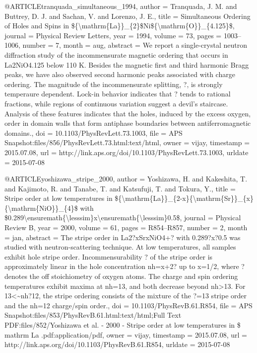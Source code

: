 @ARTICLE{tranquada_simultaneous_1994,
  author = {Tranquada, J. M. and Buttrey, D. J. and Sachan, V. and Lorenzo, J.
	E.},
  title = {Simultaneous {Ordering} of {Holes} and {Spins} in \$\{{\textbackslash}mathrm\{{La}\}\}\_\{2\}\${Ni}\$\{{\textbackslash}mathrm\{{O}\}\}\_\{4.125\}\$},
  journal = {Physical Review Letters},
  year = {1994},
  volume = {73},
  pages = {1003--1006},
  number = {7},
  month = aug,
  abstract = {We report a single-crystal neutron diffraction study of the incommensurate
	magnetic ordering that occurs in La2NiO4.125 below 110 K. Besides
	the magnetic first and third harmonic Bragg peaks, we have also observed
	second harmonic peaks associated with charge ordering. The magnitude
	of the incommensurate splitting, ?, is strongly temperaure dependent.
	Lock-in behavior indicates that ? tends to rational fractions, while
	regions of continuous variation suggest a devil's staircase. Analysis
	of these features indicates that the holes, induced by the excess
	oxygen, order in domain walls that form antiphase boundaries between
	antiferromagnetic domains.},
  doi = {10.1103/PhysRevLett.73.1003},
  file = {APS Snapshot:files/856/PhysRevLett.73.html:text/html},
  owner = {vijay},
  timestamp = {2015.07.08},
  url = {http://link.aps.org/doi/10.1103/PhysRevLett.73.1003},
  urldate = {2015-07-08}
}

@ARTICLE{yoshizawa_stripe_2000,
  author = {Yoshizawa, H. and Kakeshita, T. and Kajimoto, R. and Tanabe, T. and
	Katsufuji, T. and Tokura, Y.},
  title = {Stripe order at low temperatures in \$\{{\textbackslash}mathrm\{{La}\}\}\_\{2-x\}\{{\textbackslash}mathrm\{{Sr}\}\}\_\{x\}\{{\textbackslash}mathrm\{{NiO}\}\}\_\{4\}\$
	with \$0.289{\textbackslash}ensuremath\{{\textbackslash}lesssim\}x{\textbackslash}ensuremath\{{\textbackslash}lesssim\}0.5\$},
  journal = {Physical Review B},
  year = {2000},
  volume = {61},
  pages = {R854--R857},
  number = {2},
  month = jan,
  abstract = {The stripe order in La2?xSrxNiO4+? with 0.289?x?0.5 was studied with
	neutron-scattering technique. At low temperatures, all samples exhibit
	hole stripe order. Incommensurability ? of the stripe order is approximately
	linear in the hole concentration nh=x+2? up to x=1/2, where ? denotes
	the off stoichiometry of oxygen atoms. The charge and spin ordering
	temperatures exhibit maxima at nh=13, and both decrease beyond nh{\textgreater}13.
	For 13{\textless}{\textasciitilde}nh?12, the stripe ordering consists
	of the mixture of the ?=13 stripe order and the nh=12 charge/spin
	order.},
  doi = {10.1103/PhysRevB.61.R854},
  file = {APS Snapshot:files/853/PhysRevB.61.html:text/html;Full Text PDF:files/852/Yoshizawa et al. - 2000 - Stripe order at low temperatures in \$ mathrm La .pdf:application/pdf},
  owner = {vijay},
  timestamp = {2015.07.08},
  url = {http://link.aps.org/doi/10.1103/PhysRevB.61.R854},
  urldate = {2015-07-08}
}

